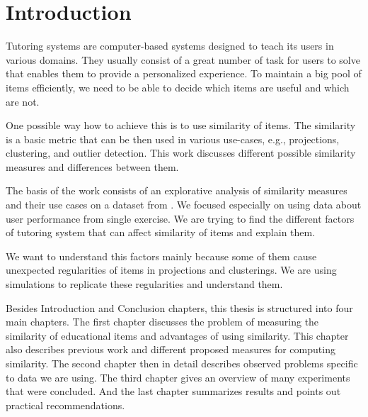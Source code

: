 \documentclass[
  print, %
  table,   %
  nolof,     %
  nolot,     %
  nocover,
  color,
  final,
]{fithesis3}
\begin{document}



\chapter*{Introduction}


Tutoring systems are computer-based systems designed to teach its users in various domains. They usually consist of a great number of task for users to solve that enables them to provide a personalized experience. To maintain a big pool of items efficiently, we need to be able to decide which items are useful and which are not.


One possible way how to achieve this is to use similarity of items. The similarity is a basic metric that can be then used in various use-cases, e.g., projections, clustering, and outlier detection. This work discusses different possible similarity measures and differences between them.


The basis of the work consists of an explorative analysis of similarity measures and their use cases on a dataset from \umimeCesky{}. We focused especially on using data about user performance from single exercise. We are trying to find the different factors of tutoring system that can affect similarity of items and explain them.


We want to understand this factors mainly because some of them cause unexpected regularities of items in projections and clusterings. We are using simulations to replicate these regularities and understand them.


Besides Introduction and Conclusion chapters, this thesis is structured into four main chapters. The first chapter discusses the problem of measuring the similarity of educational items and advantages of using similarity. This chapter also describes previous work and different proposed measures for computing similarity. The second chapter then in detail describes observed problems specific to data we are using. The third chapter gives an overview of many experiments that were concluded. And the last chapter summarizes results and points out practical recommendations.
\end{document}
